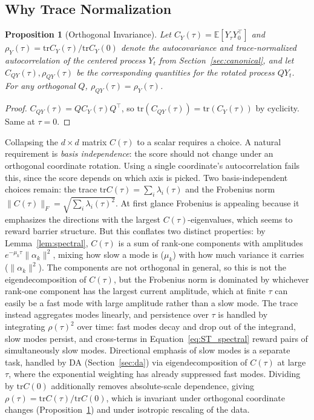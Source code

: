 \documentclass{article}
\newcommand{\E}{\mathbb{E}}
\newcommand{\tr}{\mathrm{tr}}
\newtheorem{proposition}{Proposition}
\begin{document}

\subsection{Why Trace Normalization}
\label{app:trace_normalization}

\begin{proposition}[Orthogonal Invariance]
\label{prop:orthogonal_invariance}
Let $C_Y(\tau) = \E[Y_\tau Y_0^\top]$ and $\rho_Y(\tau) = \tr C_Y(\tau)/\tr C_Y(0)$ denote the autocovariance and trace-normalized autocorrelation of the centered process $Y_t$ from Section~\ref{sec:canonical}, and let $C_{QY}(\tau), \rho_{QY}(\tau)$ be the corresponding quantities for the rotated process $QY_t$. For any orthogonal $Q$, $\rho_{QY}(\tau) = \rho_Y(\tau)$.
\end{proposition}

\begin{proof}
$C_{QY}(\tau) = Q C_Y(\tau) Q^\top$, so $\tr(C_{QY}(\tau)) = \tr(C_Y(\tau))$ by cyclicity. Same at $\tau = 0$.
\end{proof}

Collapsing the $d \times d$ matrix $C(\tau)$ to a scalar requires a choice. A natural requirement is \emph{basis independence}: the score should not change under an orthogonal coordinate rotation. Using a single coordinate's autocorrelation fails this, since the score depends on which axis is picked. Two basis-independent choices remain: the trace $\tr C(\tau) = \sum_i \lambda_i(\tau)$ and the Frobenius norm $\|C(\tau)\|_F = \sqrt{\sum_i \lambda_i(\tau)^2}$. At first glance Frobenius is appealing because it emphasizes the directions with the largest $C(\tau)$-eigenvalues, which seems to reward barrier structure. But this conflates two distinct properties: by Lemma~\ref{lem:spectral}, $C(\tau)$ is a sum of rank-one components with amplitudes $e^{-\mu_k \tau} \|\alpha_k\|^2$, mixing how slow a mode is ($\mu_k$) with how much variance it carries ($\|\alpha_k\|^2$). The components are not orthogonal in general, so this is not the eigendecomposition of $C(\tau)$, but the Frobenius norm is dominated by whichever rank-one component has the largest current amplitude, which at finite $\tau$ can easily be a fast mode with large amplitude rather than a slow mode. The trace instead aggregates modes linearly, and persistence over $\tau$ is handled by integrating $\rho(\tau)^2$ over time: fast modes decay and drop out of the integrand, slow modes persist, and cross-terms in Equation~\eqref{eq:ST_spectral} reward pairs of simultaneously slow modes. Directional emphasis of slow modes is a separate task, handled by DA (Section~\ref{sec:da}) via eigendecomposition of $C(\tau)$ at large $\tau$, where the exponential weighting has already suppressed fast modes. Dividing by $\tr C(0)$ additionally removes absolute-scale dependence, giving $\rho(\tau) = \tr C(\tau) / \tr C(0)$, which is invariant under orthogonal coordinate changes (Proposition~\ref{prop:orthogonal_invariance}) and under isotropic rescaling of the data.
\end{document}
